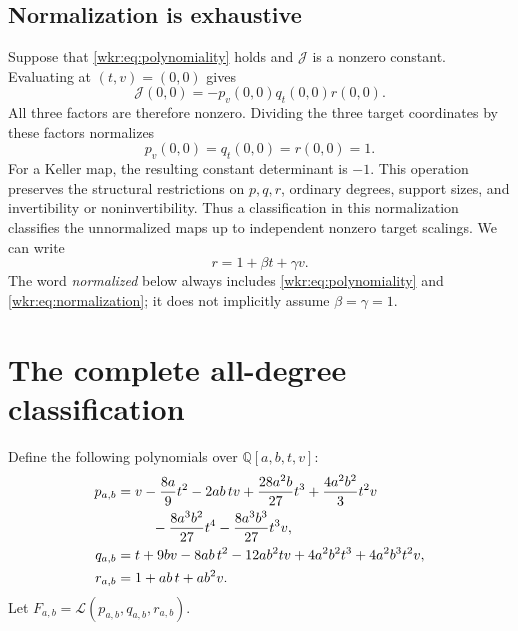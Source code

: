 \documentclass[11pt,a4paper]{article}
\numberwithin{equation}{section}
\theoremstyle{definition}
\theoremstyle{remark}
\newcommand{\Q}{\mathbb{Q}}
\newcommand{\J}{\mathcal{J}}
\begin{document}
\subsection{Normalization is exhaustive}

Suppose that \eqref{wkr:eq:polynomiality} holds and $\J$ is a nonzero constant.
Evaluating at $(t,v)=(0,0)$ gives
\begin{equation}\label{wkr:eq:originJ}
\J(0,0)=-p_v(0,0)q_t(0,0)r(0,0).
\end{equation}
All three factors are therefore nonzero. Dividing the three target
coordinates by these factors normalizes
\begin{equation}\label{wkr:eq:normalization}
p_v(0,0)=q_t(0,0)=r(0,0)=1.
\end{equation}
For a Keller map, the resulting constant determinant is $-1$.
This operation preserves the structural restrictions on $p,q,r$, ordinary
degrees, support sizes, and invertibility or noninvertibility. Thus a
classification in this normalization classifies the unnormalized maps up
to independent nonzero target scalings. We can write
\begin{equation}\label{wkr:eq:r}
r=1+\beta t+\gamma v.
\end{equation}
The word \emph{normalized} below always includes
\eqref{wkr:eq:polynomiality} and \eqref{wkr:eq:normalization}; it does not implicitly
assume $\beta=\gamma=1$.

\section{The complete all-degree classification}
\label{wkr:sec:main}

Define the following polynomials over $\Q[a,b,t,v]$:
\begin{subequations}\label{wkr:eq:family}
\begin{align}
p_{a,b}={}&v-\frac{8a}{9}t^2-2ab\,tv
 +\frac{28a^2b}{27}t^3+\frac{4a^2b^2}{3}t^2v \notag\\
 &\hspace{1.2em}-\frac{8a^3b^2}{27}t^4-\frac{8a^3b^3}{27}t^3v,
 \label{wkr:eq:familyp}\\
q_{a,b}={}&t+9bv-8ab\,t^2-12ab^2tv
 +4a^2b^2t^3+4a^2b^3t^2v,\label{wkr:eq:familyq}\\
r_{a,b}={}&1+ab\,t+ab^2v.\label{wkr:eq:familyr}
\end{align}
\end{subequations}
Let $F_{a,b}=\mathcal L(p_{a,b},q_{a,b},r_{a,b})$.
\end{document}
